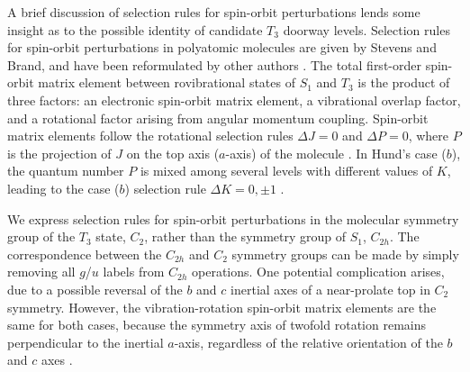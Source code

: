 \documentclass[12pt]{mitthesis}
\begin{document}

A brief discussion of selection rules for spin-orbit perturbations
lends some insight as to the possible identity of candidate $T_3$
doorway levels.  Selection rules for spin-orbit perturbations in
polyatomic molecules are given by Stevens and Brand, and have been
reformulated by other authors \cite{stevens73, howard78, dupre84}.
The total first-order spin-orbit matrix element between rovibrational
states of $S_1$ and $T_3$ is the product of three factors: an
electronic spin-orbit matrix element, a vibrational overlap factor,
and a rotational factor arising from angular momentum coupling.
Spin-orbit matrix elements follow the rotational selection rules
$\Delta J = 0$ and $\Delta P = 0$, where $P$ is the projection of $J$
on the top axis ($a$-axis) of the molecule \cite{hougen64}.  In Hund's
case ($b$), the quantum number $P$ is mixed among several levels with
different values of $K$, leading to the case ($b$) selection rule
$\Delta K = 0, \pm 1$ \cite{hougen64, stevens73}.

We express selection rules for spin-orbit perturbations in the
molecular symmetry group of the $T_3$ state, $C_2$, rather than the
symmetry group of $S_1$, $C_{2h}$.  The correspondence between the
$C_{2h}$ and $C_{2}$ symmetry groups can be made by simply removing
all $g$/$u$ labels from $C_{2h}$ operations.  One potential
complication arises, due to a possible reversal of the $b$ and $c$
inertial axes of a near-prolate top in $C_2$ symmetry.  However, the
vibration-rotation spin-orbit matrix elements are the same for both
cases, because the symmetry axis of twofold rotation remains
perpendicular to the inertial $a$-axis, regardless of the relative
orientation of the $b$ and $c$ axes \cite{hougen64}.
\end{document}
